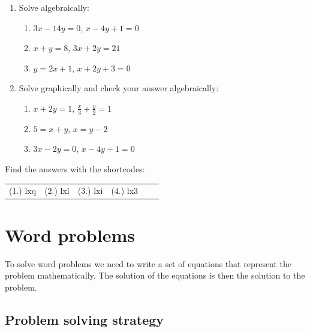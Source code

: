 \begin{exercises}{}
{
\begin{enumerate}[noitemsep, label=\textbf{\arabic*}. ] 

\item Solve algebraically: 
\begin{enumerate}[noitemsep, label=\textbf{(\alph*)} ] 
\item $3x-14y=0$, $x-4y+1=0$
\item $x+y=8$, $3x + 2y = 21$
\item $y=2x+1$, $x + 2y + 3 = 0$
\end{enumerate}

\item Solve graphically and check your answer algebraically:

\begin{enumerate}[noitemsep, label=\textbf{(\alph*)} ] 

\item  $x+2y=1$, $\frac{x}{3} + \frac{y}{2} = 1$
\item $5= x+y$, $x = y-2$
\item $3x - 2y = 0$, $x - 4y + 1 = 0$

\end{enumerate}
\end{enumerate}
\practiceinfo
\par {} Find the answers with the shortcodes:
\par \begin{tabular}[h]{cccccc}
(1.) lxq  &  (2.) lxl  &  (3.) lxi  &  (4.) lx3  & \end{tabular}
}
\end{exercises}

\section{Word problems}

To solve word problems we need to write a set of equations that represent the problem mathematically. 
The solution of the equations is then the solution to the problem.

\subsection*{Problem solving strategy}

